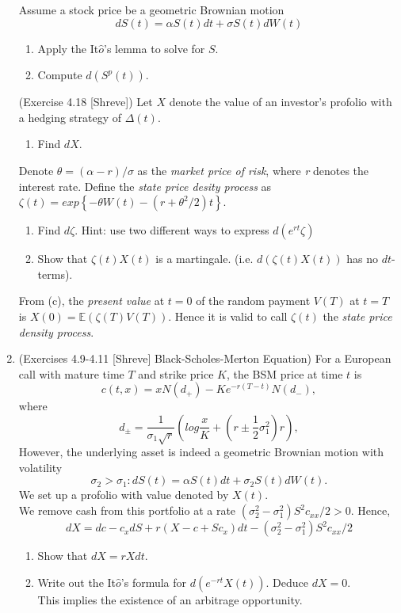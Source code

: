 \documentclass{article}
\begin{document}
\begin{enumerate}
Assume a stock price be a geometric Brownian motion \[dS(t) = \alpha S(t)dt + \sigma S(t)dW(t)\] 
\begin{enumerate}
\item Apply the It$\hat o$'s lemma to solve for $S$.
\item Compute $d(S^p(t))$.
\end{enumerate}
(Exercise 4.18 [Shreve]) Let $X$ denote the value of an investor's profolio with a hedging strategy of $\Delta(t)$.
\begin{enumerate}
\addtocounter{enumii}{2}
\item Find $dX$.
\end{enumerate}
Denote $\theta = (\alpha-r)/\sigma$ as the \emph{market price of risk}, where \emph{r} denotes the interest rate. Define the \emph{state price desity process} as 
$\zeta(t) = exp\left\{ -\theta W(t) - \left(r+ \theta^2/2\right)t \right\}$. 
\begin{enumerate}
\addtocounter{enumii}{3}
\item Find $d\zeta$. Hint: use two different ways to express
$d(e^{rt}\zeta)$
\item Show that $\zeta(t)X(t)$ is a martingale. (i.e. $d(\zeta(t)X(t))$ has no $dt$-terms). 
\end{enumerate}
From (c), the \emph{present value} at $t=0$ of the random payment $V(T)$ at $t=T$ is $X(0)=\mathbb E(\zeta(T)V(T))$. Hence it is valid to call $\zeta(t)$ the \emph{state price density process}.
\item (Exercises 4.9-4.11 [Shreve] Black-Scholes-Merton Equation)
For a European call with mature time $T$ and strike price $K$, the BSM price at time $t$ is 
\[
c(t,x)=xN(d_+)-Ke^{-r(T-t)}N(d_-),
\]
where
\[
d_{\pm} = \frac1{\sigma_1\sqrt{r}} \left( log\frac xK + (r\pm\frac12\sigma_1^2)r\right),
\]
However, the underlying asset is indeed a geometric Brownian motion with volatility 
\[\sigma_2>\sigma_1: dS(t)=\alpha S(t)dt + \sigma_2S(t)dW(t).\]
We set up a profolio with value denoted by $X(t)$. 
\\We remove cash from this portfolio at a rate $(\sigma_2^2-\sigma_1^2)S^2c_{xx}/2>0$. Hence, 
\[
dX = dc - c_xdS + r(X-c+Sc_x)dt - (\sigma_2^2-\sigma_1^2)S^2c_{xx}/2
\]
\begin{enumerate}
\item Show that $dX=rXdt$.
\item Write out the It$\hat o$'s formula for $d(e^{-rt}X(t))$. Deduce $dX=0$. \\This implies the existence of an arbitrage opportunity.

\end{enumerate}
\end{enumerate}
\end{document}
